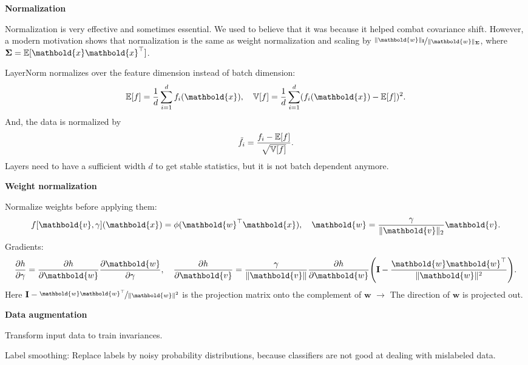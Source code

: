\documentclass[10pt]{article}
\newenvironment{topic}[1]
{\textbf{\sffamily \footnotesize \colorbox{black}{\rlap{\textbf{\textcolor{white}{#1}}}\hspace{\linewidth}\hspace{-2\fboxsep}}}}
{}
\newenvironment{subtopic}[1]
{\vspace{0.1cm} \begin{center}\textbf{\footnotesize \sffamily #1}\end{center}}
{}
\renewcommand{\mat}[1]{\ensuremath{\mathbf{#1}}}
\renewcommand{\vec}[1]{\ensuremath{\mathbold{#1}}}
\renewcommand{\Var}{\mathbb{V}}
\begin{document}
\begin{multicols*}{3}
\begin{topic}{Tricks of the trade}
\begin{subtopic}{Normalization}
            Normalization is very effective and sometimes essential. We used to believe that it was because it
            helped combat covariance shift. However, a modern motivation shows that normalization is the same
            as weight normalization and scaling by $\nicefrac{\| \vec{w} \|_{\mat{I}}}{\| \vec{w}
                \|_{\mat{\Sigma}}}$, where $\mat{\Sigma} = \E[\vec{x}\transpose{\vec{x}}]$.

            LayerNorm normalizes over the feature dimension instead of batch dimension: \[
                \E[f] = \frac{1}{d} \sum_{i=1}^{d} f_i(\vec{x}), \quad \Var[f] = \frac{1}{d} \sum_{i=1}^{d} (f_i(\vec{x}) - \E[f])^2.
            \]
            And, the data is normalized by \[
                \tilde{f}_i = \frac{f_i - \E[f]}{\sqrt{\Var[f]}}.
            \]
            Layers need to have a sufficient width $d$ to get stable statistics, but it is not batch
            dependent anymore.
        \end{subtopic}

        \begin{subtopic}{Weight normalization}
            Normalize weights before applying them: \[
                f[\vec{v},\gamma](\vec{x}) = \phi(\transpose{\vec{w}}\vec{x}), \quad \vec{w} = \frac{\gamma}{\| \vec{v} \|_2} \vec{v}.
            \]
            Gradients: \[
                \pdv{h}{\gamma} = \pdv{h}{\vec{w}} \pdv{\vec{w}}{\gamma}, \quad \pdv{h}{\vec{v}} = \frac{\gamma}{\| \vec{v} \|} \pdv{h}{\vec{w}} \lft( \mat{I} - \frac{\vec{w}\transpose{\vec{w}}}{\| \vec{w} \|^2} \rgt).
            \]
            Here $\mat{I} - \nicefrac{\vec{w}\transpose{\vec{w}}}{\| \vec{w} \|^2}$ is the projection matrix
            onto the complement of $\vec{w}$ $\to$ The direction of $\vec{w}$ is projected out.
        \end{subtopic}

        \begin{subtopic}{Data augmentation}
            Transform input data to train invariances.

            Label smoothing: Replace labels by noisy probability distributions, because classifiers are not
            good at dealing with mislabeled data.
        \end{subtopic}


\end{topic}
\end{multicols*}
\end{document}
